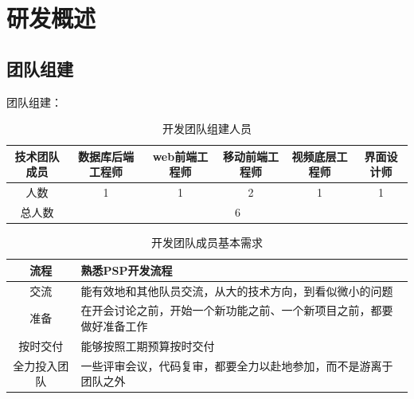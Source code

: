 \section{研发概述}
\subsection{团队组建}
团队组建：
\begin{table}[H]
  \centering
  \caption{开发团队组建人员}
    \begin{tabular}{|c|ccccc|}
    \hline
    \textcolor[rgb]{ .298,  .282,  .239}{技术团队成员} & \multicolumn{1}{p{6.78em}|}{\textcolor[rgb]{ .298,  .282,  .239}{数据库后端工程师}} & \multicolumn{1}{p{5.61em}|}{\textcolor[rgb]{ .298,  .282,  .239}{ web前端工程师}} & \multicolumn{1}{p{6.11em}|}{\textcolor[rgb]{ .298,  .282,  .239}{移动前端工程师}} & \multicolumn{1}{p{5.72em}|}{\textcolor[rgb]{ .298,  .282,  .239}{视频底层工程师}} & \multicolumn{1}{p{4.165em}|}{\textcolor[rgb]{ .298,  .282,  .239}{界面设计师}} \\
    \hline
    \textcolor[rgb]{ .298,  .282,  .239}{人数} & \multicolumn{1}{c|}{\textcolor[rgb]{ .298,  .282,  .239}{1}} & \multicolumn{1}{c|}{\textcolor[rgb]{ .298,  .282,  .239}{1}} & \multicolumn{1}{c|}{\textcolor[rgb]{ .298,  .282,  .239}{2}} & \multicolumn{1}{c|}{\textcolor[rgb]{ .298,  .282,  .239}{1}} & \textcolor[rgb]{ .298,  .282,  .239}{1} \\
    \hline
    \textcolor[rgb]{ .298,  .282,  .239}{总人数} & \multicolumn{5}{c|}{\textcolor[rgb]{ .298,  .282,  .239}{6}} \\
    \hline
    \end{tabular}%
  \label{tab:kaifarenyuan}%
\end{table}%


\begin{table}[H]
  \centering
  \caption{开发团队成员基本需求}
    \begin{tabular}{|c|p{28.61em}|}
    \hline
    \textcolor[rgb]{ .298,  .282,  .239}{流程} & \textcolor[rgb]{ .298,  .282,  .239}{熟悉PSP开发流程} \\
    \hline
    \textcolor[rgb]{ .298,  .282,  .239}{交流} & \textcolor[rgb]{ .298,  .282,  .239}{能有效地和其他队员交流，从大的技术方向，到看似微小的问题} \\
    \hline
    \textcolor[rgb]{ .298,  .282,  .239}{准备} & \textcolor[rgb]{ .298,  .282,  .239}{在开会讨论之前，开始一个新功能之前、一个新项目之前，都要做好准备工作} \\
    \hline
    \textcolor[rgb]{ .298,  .282,  .239}{按时交付} & \textcolor[rgb]{ .298,  .282,  .239}{能够按照工期预算按时交付} \\
    \hline
    \textcolor[rgb]{ .298,  .282,  .239}{全力投入团队} & \textcolor[rgb]{ .298,  .282,  .239}{一些评审会议，代码复审，都要全力以赴地参加，而不是游离于团队之外} \\
    \hline
    \end{tabular}%
  \label{tab:kaifarenyuanyaoqiu}%
\end{table}%




